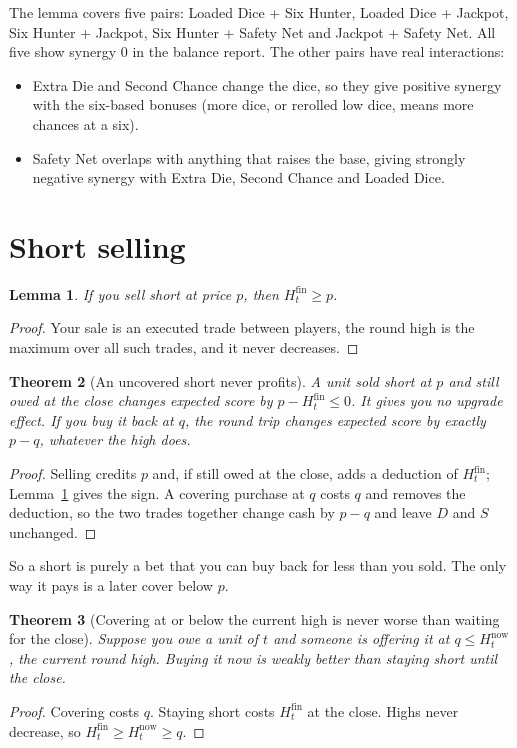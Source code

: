 \documentclass[11pt]{article}
\newtheorem{theorem}{Theorem}
\newtheorem{lemma}[theorem]{Lemma}
\theoremstyle{definition}
\newcommand{\Hf}{H^{\mathrm{fin}}}
\begin{document}
The lemma covers five pairs: Loaded Dice + Six Hunter, Loaded Dice + Jackpot, Six Hunter + Jackpot, Six Hunter + Safety Net and Jackpot + Safety Net. All five show synergy $0$ in the balance report. The other pairs have real interactions:
\begin{itemize}
\item Extra Die and Second Chance change the dice, so they give positive synergy with the six-based bonuses (more dice, or rerolled low dice, means more chances at a six).
\item Safety Net overlaps with anything that raises the base, giving strongly negative synergy with Extra Die, Second Chance and Loaded Dice.
\end{itemize}

\section{Short selling}

\begin{lemma}\label{lem:high}
If you sell short at price $p$, then $\Hf_t \ge p$.
\end{lemma}
\begin{proof}
Your sale is an executed trade between players, the round high is the maximum over all such trades, and it never decreases.
\end{proof}

\begin{theorem}[An uncovered short never profits]\label{thm:short}
A unit sold short at $p$ and still owed at the close changes expected score by $p - \Hf_t \le 0$. It gives you no upgrade effect. If you buy it back at $q$, the round trip changes expected score by exactly $p - q$, whatever the high does.
\end{theorem}
\begin{proof}
Selling credits $p$ and, if still owed at the close, adds a deduction of $\Hf_t$; Lemma~\ref{lem:high} gives the sign. A covering purchase at $q$ costs $q$ and removes the deduction, so the two trades together change cash by $p - q$ and leave $D$ and $S$ unchanged.
\end{proof}

So a short is purely a bet that you can buy back for less than you sold. The only way it pays is a later cover below $p$.

\begin{theorem}[Covering at or below the current high is never worse than waiting for the close]\label{thm:cover}
Suppose you owe a unit of $t$ and someone is offering it at $q \le H_t^{\text{now}}$, the current round high. Buying it now is weakly better than staying short until the close.
\end{theorem}
\begin{proof}
Covering costs $q$. Staying short costs $\Hf_t$ at the close. Highs never decrease, so $\Hf_t \ge H_t^{\text{now}} \ge q$.
\end{proof}
\end{document}
